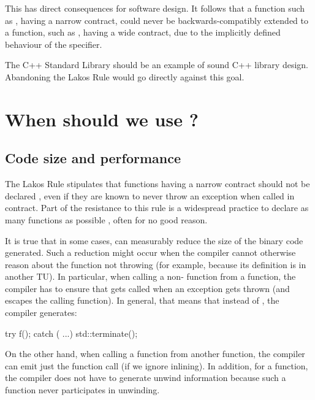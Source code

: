 This has direct consequences for software design. It follows that a function such as , having a narrow contract, could never be backwards-compatibly extended to a function, such as , having a wide contract, due to the implicitly defined behaviour of the  specifier. 

The C++ Standard Library should be an example of sound C++ library design. Abandoning the Lakos Rule would go directly against this goal.

\section{When should we use ?}
\label{sec:noexcept}

\subsection{Code size and performance}

The Lakos Rule stipulates that functions having a narrow contract should not be declared , even if they are known to never throw an exception when called in contract. Part of the resistance to this rule is a widespread practice to declare as many functions as possible , often for no good reason.

It is true that in some cases,  can measurably reduce the size of the binary code generated. Such a reduction might occur when the compiler cannot otherwise reason about the function not throwing (for example, because its definition is in another TU). In particular, when calling a non- function  from a  function, the compiler has to ensure that  gets called when an exception gets thrown (and escapes the calling function). In general, that means that instead of , the compiler generates:
\begin{codeblock}
try { f(); } catch ( ...) { std::terminate(); }
\end{codeblock}
On the other hand, when calling a  function from another  function, the compiler can emit just the function call (if we ignore inlining). In addition, for a  function, the compiler does not have to generate unwind information because such a function never participates in unwinding.

